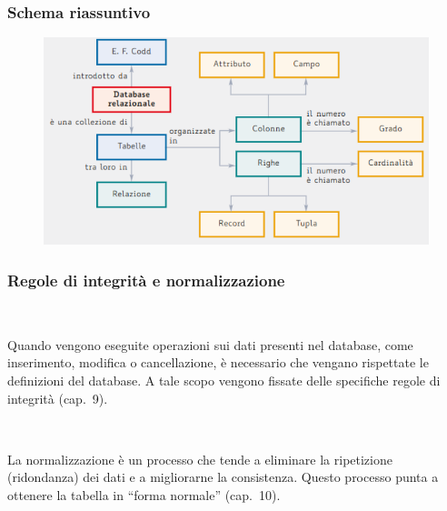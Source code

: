 \documentclass[]{beamer}
\begin{document}
\begin{frame}
\frametitle{Schema riassuntivo}
\begin{figure}
  \includegraphics[width=\columnwidth]{img/schemadb1.png}
\end{figure}
\end{frame}


\begin{frame}
\frametitle{Regole di integrità e normalizzazione}
\begin{center}
  \href{https://drive.google.com/file/d/1ZnmILMv5fum42uVRmkTTZmq5LovXvvpv/view?usp=share_link}{}
\end{center}

~

Quando vengono eseguite operazioni sui dati presenti nel database, come inserimento, modifica o cancellazione, è necessario che vengano rispettate le definizioni del database. A tale scopo vengono fissate delle specifiche \alert<1>{regole di integrità} (cap.~9).\pause

~

La \alert<2>{normalizzazione} è un processo che tende a eliminare la ripetizione (ridondanza) dei dati e a migliorarne la consistenza. Questo processo punta a ottenere la tabella in ``forma normale'' (cap.~10).
\end{frame}






\end{document}
